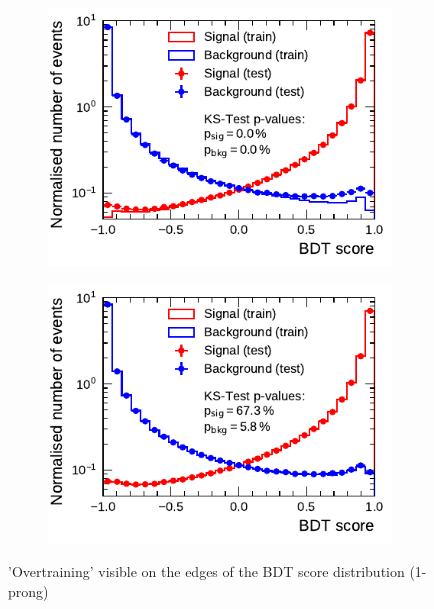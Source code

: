 \begin{figure}[htb]
  \begin{subfigure}[t]{0.48\textwidth}
    \centering
    \includegraphics{./figures/bdt_perf/scores/grid_1p0304.pdf}
    \label{fig:bdt_score_1p}
  \end{subfigure}\hfill
  \begin{subfigure}[t]{0.48\textwidth}
    \centering
    \includegraphics{./figures/bdt_perf/scores/grid_1p_subsampling0269.pdf}
    \label{fig:bdt_score_1p_ks5}
  \end{subfigure}
  \caption{'Overtraining' visible on the edges of the BDT score distribution
    (1-prong)}
  \label{fig:bdt_overfitting_scores}
\end{figure}

